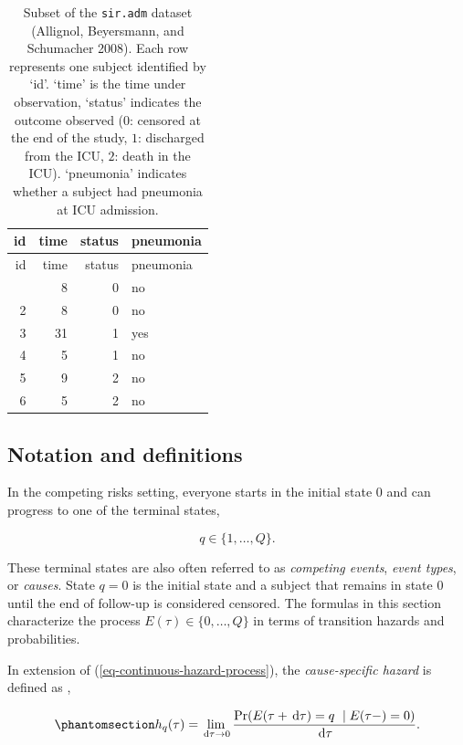 \documentclass[
  letterpaper,
  krantz2]{style/krantz}
\begin{document}
\begin{longtable}[]{@{}rrrl@{}}
\caption{Subset of the \texttt{sir.adm} dataset (Allignol, Beyersmann,
and Schumacher 2008). Each row represents one subject identified by
`id'. `time' is the time under observation, `status' indicates the
outcome observed (\(0\): censored at the end of the study, \(1\):
discharged from the ICU, \(2\): death in the ICU). `pneumonia' indicates
whether a subject had pneumonia at ICU
admission.}\label{tbl-surv-data-siradm}\tabularnewline
\toprule\noalign{}
id & time & status & pneumonia \\
\midrule\noalign{}
\endfirsthead
\toprule\noalign{}
id & time & status & pneumonia \\
\midrule\noalign{}
\endhead
\bottomrule\noalign{}
\endlastfoot
1 & 8 & 0 & no \\
2 & 8 & 0 & no \\
3 & 31 & 1 & yes \\
4 & 5 & 1 & no \\
5 & 9 & 2 & no \\
6 & 5 & 2 & no \\
\end{longtable}

\subsection{Notation and definitions}\label{sec-cr-notation}

In the competing risks setting, everyone starts in the initial state
\(0\) and can progress to one of the terminal states,

\[
q \in \{1,\ldots,Q\}.
\]

These terminal states are also often referred to
as \emph{competing events}, \emph{event types}, or \emph{causes}. State
\(q = 0\) is the initial state and a subject that remains in state \(0\)
until the end of follow-up is considered censored. The formulas in this
section characterize the process \(E(\tau) \in \{0,\ldots, Q\}\) in
terms of transition hazards and probabilities.

In extension of (\ref{eq-continuous-hazard-process}), the
\emph{cause-specific hazard} is defined as
,

\begin{equation}\phantomsection\label{eq-cause-specific-hazard}{
h_q(\tau) = \lim_{\,\mathrm{d}\tau\to 0} \frac{\Pr(E(\tau + \,\mathrm{d}\tau) = q\  \mid E(\tau-)=0)}{\,\mathrm{d}\tau}.
}\end{equation}
\end{document}
